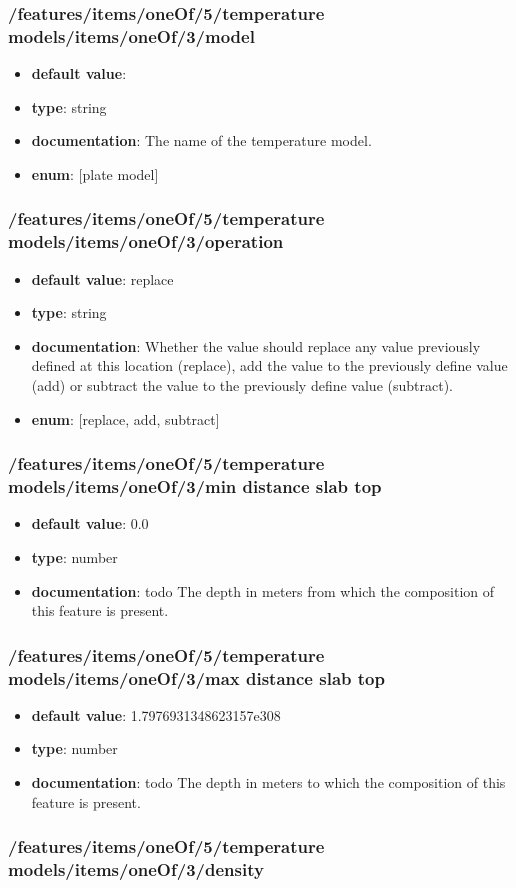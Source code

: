 \subsubsection{/features/items/oneOf/5/temperature models/items/oneOf/3/model}
\begin{itemize}\item {\bf default value}: 
\item {\bf type}: string
\item {\bf documentation}: The name of the temperature model.
\item {\bf enum}: [plate model]\end{itemize}\subsubsection{/features/items/oneOf/5/temperature models/items/oneOf/3/operation}
\begin{itemize}\item {\bf default value}: replace
\item {\bf type}: string
\item {\bf documentation}: Whether the value should replace any value previously defined at this location (replace), add the value to the previously define value (add) or subtract the value to the previously define value (subtract).
\item {\bf enum}: [replace, add, subtract]\end{itemize}\subsubsection{/features/items/oneOf/5/temperature models/items/oneOf/3/min distance slab top}
\begin{itemize}\item {\bf default value}: 0.0
\item {\bf type}: number
\item {\bf documentation}: todo The depth in meters from which the composition of this feature is present.
\end{itemize}\subsubsection{/features/items/oneOf/5/temperature models/items/oneOf/3/max distance slab top}
\begin{itemize}\item {\bf default value}: 1.7976931348623157e308
\item {\bf type}: number
\item {\bf documentation}: todo The depth in meters to which the composition of this feature is present.
\end{itemize}\subsubsection{/features/items/oneOf/5/temperature models/items/oneOf/3/density}
